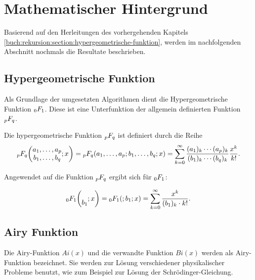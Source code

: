 %
%
%
\section{Mathematischer Hintergrund
\label{0f1:section:mathHintergrund}}
Basierend auf den Herleitungen des vorhergehenden Kapitels \ref{buch:rekursion:section:hypergeometrische-funktion}, werden im nachfolgenden Abschnitt nochmals die Resultate
beschrieben.

\subsection{Hypergeometrische Funktion
\label{0f1:subsection:hypergeometrisch}}
Als Grundlage der umgesetzten Algorithmen dient die Hypergeometrische Funktion $\mathstrut_0F_1$. Diese ist eine Unterfunktion der allgemein definierten Funktion $\mathstrut_pF_q$.

\begin{definition}
	\label{0f1:math:qFp:def}
	Die hypergeometrische Funktion
	$\mathstrut_pF_q$ ist definiert durch die Reihe
	\[
	\mathstrut_pF_q
	\biggl(
	\begin{matrix}
		a_1,\dots,a_p\\
		b_1,\dots,b_q
	\end{matrix}
	;
	x
	\biggr)
	=
	\mathstrut_pF_q(a_1,\dots,a_p;b_1,\dots,b_q;x)
	=
	\sum_{k=0}^\infty
	\frac{(a_1)_k\cdots(a_p)_k}{(b_1)_k\cdots(b_q)_k}\frac{x^k}{k!}.
	\]
\end{definition}

Angewendet auf die Funktion $\mathstrut_pF_q$ ergibt sich für $\mathstrut_0F_1$:

\begin{equation}
    \label{0f1:math:0f1:eq}
    \mathstrut_0F_1
    \biggl(
    \begin{matrix}
    \\
    b_1
    \end{matrix}
    ;
    x
    \biggr)
    =
    \mathstrut_0F_1(;b_1;x)
    =
    \sum_{k=0}^\infty
    \frac{x^k}{(b_1)_k \cdot k!}.
\end{equation}




\subsection{Airy Funktion
\label{0f1:subsection:airy}}
Die Airy-Funktion $Ai(x)$ und die verwandte Funktion $Bi(x)$ werden als Airy-Funktion bezeichnet. Sie werden zur Lösung verschiedener physikalischer Probleme benutzt, wie zum Beispiel zur Lösung der Schrödinger-Gleichung. \cite{0f1:wiki-airyFunktion}

